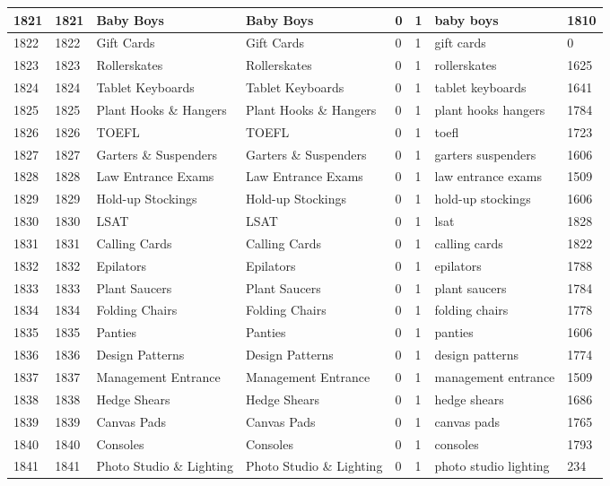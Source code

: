 \begin{longtable}{|l|l|l|l|l|l|l|l|}
1821 & 1821 & Baby Boys & Baby Boys & 0 & 1 & baby boys & 1810 \\ \hline 
1822 & 1822 & Gift Cards & Gift Cards & 0 & 1 & gift cards & 0 \\ \hline 
1823 & 1823 & Rollerskates & Rollerskates & 0 & 1 & rollerskates & 1625 \\ \hline 
1824 & 1824 & Tablet Keyboards & Tablet Keyboards & 0 & 1 & tablet keyboards & 1641 \\ \hline 
1825 & 1825 & Plant Hooks \& Hangers & Plant Hooks \& Hangers & 0 & 1 & plant hooks hangers & 1784 \\ \hline 
1826 & 1826 & TOEFL & TOEFL & 0 & 1 & toefl & 1723 \\ \hline 
1827 & 1827 & Garters \& Suspenders & Garters \& Suspenders & 0 & 1 & garters suspenders & 1606 \\ \hline 
1828 & 1828 & Law Entrance Exams & Law Entrance Exams & 0 & 1 & law entrance exams & 1509 \\ \hline 
1829 & 1829 & Hold-up Stockings & Hold-up Stockings & 0 & 1 & hold-up stockings & 1606 \\ \hline 
1830 & 1830 & LSAT & LSAT & 0 & 1 & lsat & 1828 \\ \hline 
1831 & 1831 & Calling Cards & Calling Cards & 0 & 1 & calling cards & 1822 \\ \hline 
1832 & 1832 & Epilators & Epilators & 0 & 1 & epilators & 1788 \\ \hline 
1833 & 1833 & Plant Saucers & Plant Saucers & 0 & 1 & plant saucers & 1784 \\ \hline 
1834 & 1834 & Folding Chairs & Folding Chairs & 0 & 1 & folding chairs & 1778 \\ \hline 
1835 & 1835 & Panties & Panties & 0 & 1 & panties & 1606 \\ \hline 
1836 & 1836 & Design Patterns & Design Patterns & 0 & 1 & design patterns & 1774 \\ \hline 
1837 & 1837 & Management Entrance & Management Entrance & 0 & 1 & management entrance & 1509 \\ \hline 
1838 & 1838 & Hedge Shears & Hedge Shears & 0 & 1 & hedge shears & 1686 \\ \hline 
1839 & 1839 & Canvas Pads & Canvas Pads & 0 & 1 & canvas pads & 1765 \\ \hline 
1840 & 1840 & Consoles & Consoles & 0 & 1 & consoles & 1793 \\ \hline 
1841 & 1841 & Photo Studio \& Lighting & Photo Studio \& Lighting & 0 & 1 & photo studio lighting & 234 \\ \hline 

\end{longtable}
